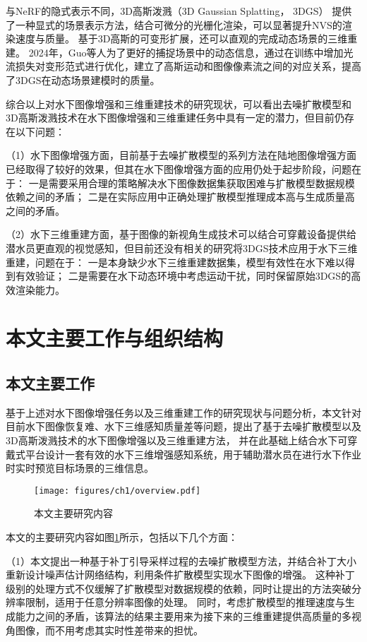 与NeRF的隐式表示不同，3D高斯泼溅（3D Gaussian Splatting， 3DGS） \cite{3DGS} 提供了一种显式的场景表示方法，结合可微分的光栅化渲染，可以显著提升NVS的渲染速度与质量。
基于3D高斯的可变形扩展\cite{dynamic_3DGS1}\cite{dynamic_3DGS2}\cite{dynamic_3DGS_efficient}\cite{4DGS}，还可以直观的完成动态场景的三维重建。
2024年，Guo等人\cite{flow_2024motion}为了更好的捕捉场景中的动态信息，通过在训练中增加光流损失对变形范式进行优化，建立了高斯运动和图像像素流之间的对应关系，提高了3DGS在动态场景建模时的质量。

综合以上对水下图像增强和三维重建技术的研究现状，可以看出去噪扩散模型和3D高斯泼溅技术在水下图像增强和三维重建任务中具有一定的潜力，但目前仍存在以下问题：

（1）水下图像增强方面，目前基于去噪扩散模型的系列方法在陆地图像增强方面已经取得了较好的效果，但其在水下图像增强方面的应用仍处于起步阶段，问题在于：
一是需要采用合理的策略解决水下图像数据集获取困难与扩散模型数据规模依赖之间的矛盾；
二是在实际应用中正确处理扩散模型推理成本高与生成质量高之间的矛盾。

（2）水下三维重建方面，基于图像的新视角生成技术可以结合可穿戴设备提供给潜水员更直观的视觉感知，但目前还没有相关的研究将3DGS技术应用于水下三维重建，问题在于：
一是本身缺少水下三维重建数据集，模型有效性在水下难以得到有效验证；
二是需要在水下动态环境中考虑运动干扰，同时保留原始3DGS的高效渲染能力。


\section{本文主要工作与组织结构}
\subsection{本文主要工作}
基于上述对水下图像增强任务以及三维重建工作的研究现状与问题分析，本文针对目前水下图像恢复难、水下三维感知质量差等问题，提出了基于去噪扩散模型以及3D高斯泼溅技术的水下图像增强以及三维重建方法，
并在此基础上结合水下可穿戴式平台设计一套有效的水下三维增强感知系统，用于辅助潜水员在进行水下作业时实时预览目标场景的三维信息。
\begin{figure}
    \centering
    \texttt{[image: figures/ch1/overview.pdf]}
    \caption{本文主要研究内容}
    \label{img:overview}
\end{figure}

本文的主要研究内容如图\ref{img:overview}所示，包括以下几个方面：

（1）本文提出一种基于补丁引导采样过程的去噪扩散模型方法，并结合补丁大小重新设计噪声估计网络结构，利用条件扩散模型实现水下图像的增强。
这种补丁级别的处理方式不仅缓解了扩散模型对数据规模的依赖，同时让提出的方法突破分辨率限制，适用于任意分辨率图像的处理。
同时，考虑扩散模型的推理速度与生成能力之间的矛盾，该算法的结果主要用来为接下来的三维重建提供高质量的多视角图像，而不用考虑其实时性差带来的担忧。

